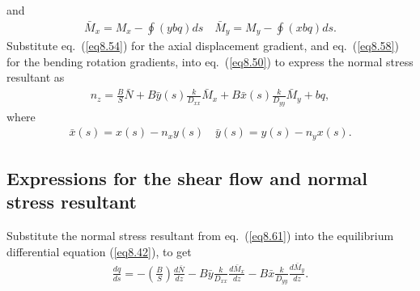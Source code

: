 \documentclass{AeroStructure-ERJohnson}
\begin{document}
and
\begin{align}\label{eq8.60}
\bar{M}_{x}=M_{x}-\oint(y b q) d s \quad \bar{M}_{y}=M_{y}-\oint(x
b q) d s.
\end{align}
Substitute eq.~(\ref{eq8.54}) for the axial displacement gradient,
and eq.~(\ref{eq8.58}) for the bending rotation gradients, into
eq.~(\ref{eq8.50}) to express the normal stress resultant as
\begin{align}\label{eq8.61}
n_{z}=\frac{B}{S} \bar{N}+B \bar{y}(s) \frac{k}{D_{x x}}
\bar{M}_{x}+B \bar{x}(s) \frac{k}{D_{y y}} \bar{M}_{y}+b q,
\end{align}
where
\begin{align}\label{eq8.62}
\bar{x}(s)=x(s)-n_{x} y(s) \quad \bar{y}(s)=y(s)-n_{y} x(s).
\end{align}

\subsection{Expressions for the shear flow and normal stress resultant}\label{sec8.2.2}

Substitute the normal stress resultant from eq.~(\ref{eq8.61})
into the equilibrium differential equation (\ref{eq8.42}), to get
\begin{align}\label{eq8.63}
\frac{d q}{d s}=-\left(\frac{B}{S}\right) \frac{d \bar{N}}{d z}-B
\bar{y} \frac{k}{D_{x x}} \frac{d \bar{M}_{x}}{d z}-B \bar{x}
\frac{k}{D_{y y}} \frac{d \bar{M}_{y}}{d z}.
\end{align}
\vspace*{2pt}
\clearpage
\end{document}
